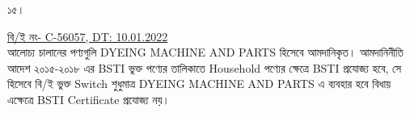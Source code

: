 \documentclass[12pt]{article}
\begin{document}
\thispagestyle{empty}
\vspace*{7.0in}
\noindent
\begin{minipage}[t]{0.05\linewidth}
১৫।
\end{minipage}
\begin{minipage}[t]{0.95\linewidth}
\underline{বি/ই নং- C-56057, DT: 10.01.2022}
\\
আলোচ্য চালানের পণ্যগুলি
DYEING MACHINE AND PARTS
হিসেবে আমদানিকৃত।
আমদানিনীতি আদেশ ২০১৫-২০১৮ এর BSTI
ভুক্ত পণ্যের তালিকাতে
Household পণ্যের ক্ষেত্রে
BSTI প্রযোজ্য হবে, সে হিসেবে বি/ই ভুক্ত
Switch শুধুমাত্র
DYEING MACHINE AND PARTS
এ ব্যবহার হবে বিধায় এক্ষেত্রে
BSTI Certificate প্রযোজ্য নয়।
\end{minipage}
\end{document}
